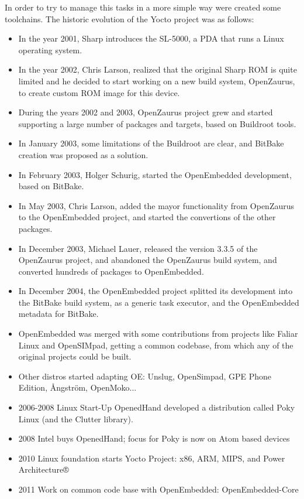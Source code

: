 \documentclass[a4paper,11pt,openany]{report}
\begin{document}
In order to try to manage this tasks in a more simple way were created some toolchains. The historic evolution of the Yocto project was as follows:

\begin{itemize}
\item In the year 2001, Sharp introduces the SL-5000, a PDA that runs a Linux operating system.
\item In the year 2002, Chris Larson, realized that the original Sharp ROM is quite limited and he decided to start working on a new build system, OpenZaurus\cite{openzaurus}, to create custom ROM image for this device.
\item During the years 2002 and 2003, OpenZaurus project grew and started supporting a large number of packages and targets, based on Buildroot tools.
\item In January 2003, some limitations of the Buildroot\cite{buildroot} are clear, and BitBake\cite{bitbake} creation was proposed as a solution.
\item In February 2003, Holger Schurig, started the OpenEmbedded\cite{openembedded} development, based on BitBake.
\item In May 2003, Chris Larson, added the mayor functionality from OpenZaurus to the OpenEmbedded project, and started the convertions of the other packages.
\item In December 2003, Michael Lauer, released the version 3.3.5 of the OpenZaurus project, and abandoned the OpenZaurus build system, and converted hundreds of packages to OpenEmbedded.
\item In December 2004, the OpenEmbedded project splitted its development into the BitBake build system, as a generic task executor, and the OpenEmbedded metadata for BitBake.
\item OpenEmbedded was merged with some contributions from projects like Faliar Linux and OpenSIMpad, getting a common codebase, from which any of the original projects could be built.
\item Other distros started adapting OE: Unslug, OpenSimpad, GPE Phone Edition, Ångström, OpenMoko... 
\item 2006-2008 Linux Start-Up OpenedHand developed a distribution called Poky Linux\cite{poky} (and the Clutter library).
\item 2008 Intel buys OpenedHand; focus for Poky is now on Atom based devices
\item 2010 Linux foundation starts Yocto Project: x86, ARM, MIPS, and Power Architecture®
\item 2011 Work on common code base with OpenEmbedded: OpenEmbedded-Core 
\end{itemize}
\end{document}
